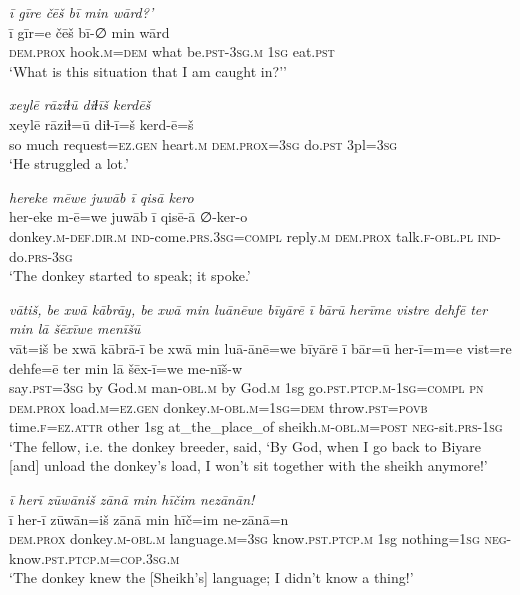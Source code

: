 \ea \label{HB.23}
\textit{ī gīre čēš bī min wārd?’} \\ 
\gll ī gīr=e čēš bī-∅ min wārd \\ 
 \textsc{dem.prox} hook\textsc{.m}\textsc{=dem} what be\textsc{.pst}\textsc{-3sg}\textsc{.m} \textsc{1sg} eat\textsc{.pst} \\ 
\glt `What is this situation that I am caught in?’'
\z 
 
\ea \label{HB.28}
\textit{xeylē rāziɫū diɫīš kerdēš} \\ 
\gll xeylē rāziɫ=ū diɫ-ī=š kerd-ē=š \\ 
 so much request\textsc{=ez}\textsc{.gen} heart\textsc{.m} \textsc{dem.prox}\textsc{=3sg} do\textsc{.pst} 3pl\textsc{=3sg} \\ 
\glt `He struggled a lot.'
\z 
 
\ea \label{HB.44}
\textit{hereke mēwe juwāb ī qisā kero} \\ 
\gll her-eke m-ē=we juwāb ī qisē-ā ∅-ker-o \\ 
 donkey\textsc{.m}\textsc{-def}\textsc{.dir}\textsc{.m} \textsc{ind-}come\textsc{.prs}\textsc{.3sg}\textsc{=compl} reply\textsc{.m} \textsc{dem.prox} talk\textsc{\textsc{.f}}\textsc{-obl}\textsc{.pl} \textsc{ind-}do\textsc{.prs}\textsc{-3sg} \\ 
\glt `The donkey started to speak; it spoke.'
\z 
 
\ea \label{HB.67}
\textit{vātiš, be xwā kābrāy, be xwā min luānēwe bīyārē ī bārū herīme vistre dehfē ter min lā šēxīwe menīšū} \\ 
\gll vāt=iš be xwā kābrā-ī be xwā min luā-ānē=we bīyārē ī bār=ū her-ī=m=e vist=re dehfe=ē ter min lā šēx-ī=we me-nīš-w \\ 
 say\textsc{.pst}\textsc{=3sg} by God\textsc{.m} man\textsc{-obl}\textsc{.m} by God\textsc{.m} 1sg go\textsc{.pst}\textsc{.ptcp}\textsc{.m}\textsc{-1sg}\textsc{=\textsc{compl}} \textsc{pn} \textsc{dem.prox} load\textsc{.m}\textsc{=ez}\textsc{.gen} donkey\textsc{.m}\textsc{-obl}\textsc{.m}\textsc{=1sg}\textsc{=dem} throw\textsc{.pst}\textsc{=\textsc{povb}} time\textsc{\textsc{.f}}\textsc{=ez}.\textsc{attr} other 1sg at\_the\_place\_of sheikh\textsc{.m}\textsc{-obl}\textsc{.m}\textsc{=\textsc{post}} \textsc{neg-}sit\textsc{.prs}\textsc{-1sg} \\ 
\glt `The fellow, i.e. the donkey breeder, said, ‘By God, when I go back to Biyare [and] unload the donkey’s load, I won’t sit together with the sheikh anymore!'
\z 
 
\ea \label{HB.71}
\textit{ī herī zūwāniš zānā min hīčim nezānān!} \\ 
\gll ī her-ī zūwān=iš zānā min hīč=im ne-zānā=n \\ 
 \textsc{dem.prox} donkey\textsc{.m}\textsc{-obl}\textsc{.m} language\textsc{.m}\textsc{=3sg} know\textsc{.pst}\textsc{.ptcp}\textsc{.m} 1sg nothing\textsc{=1sg} \textsc{neg-}know\textsc{.pst}\textsc{.ptcp}\textsc{.m}\textsc{=cop}\textsc{.3sg}\textsc{.m} \\ 
\glt `The donkey knew the [Sheikh’s] language; I didn’t know a thing!'
\z 
 
